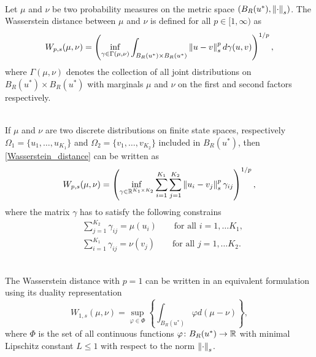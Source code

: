 \documentclass[10pt]{article}
\begin{document}
\begin{definition}
\label{Wasserstein_definition}
\leavevmode \\
Let $\mu$ and $\nu$ be two probability measures on the metric space $(B_R(u^*), \left\|\cdot\right\|_s)$. The Wasserstein distance between $\mu$ and $\nu$ is defined for all $p \in [1, \infty)$ as
\begin{equation}
\label{Wasserstein_distance}
W_{p,s}(\mu, \nu) = \left ( \inf_{\gamma \in \Gamma(\mu, \nu)} \int_{B_R(u^*) \times B_R(u^*)} \left\|u - v\right\|_s^p d \gamma(u,v) \right )^{1/p},
\end{equation}
where $\Gamma(\mu, \nu)$ denotes the collection of all joint distributions on $B_R(u^*) \times B_R(u^*)$ with marginals $\mu$ and $\nu$ on the first and second factors respectively.
\end{definition}

\begin{remark}
\leavevmode \\
If $\mu$ and $\nu$ are two discrete distributions on finite state spaces, respectively $\Omega_1 = \{ u_1, \dots, u_{K_1} \}$ and $\Omega_2 = \{ v_1, \dots, v_{K_2} \}$ included in $B_R(u^*)$, then \eqref{Wasserstein_distance} can be written as
\begin{equation}
\label{Wasserstein_distance_discrete}
W_{p,s}(\mu, \nu) = \left ( \inf_{\gamma \in \mathbb{R}^{K_1 \times K_2}} \sum_{i=1}^{K_1} \sum_{j=1}^{K_2} \left\|u_i - v_j\right\|_s^p \gamma_{ij} \right )^{1/p},
\end{equation}
where the matrix $\gamma$ has to satisfy the following constrains
\begin{align*}
& \sum_{j=1}^{K_2} \gamma_{ij} = \mu(u_i) \qquad \text{for all } i = 1, \dots K_1, \\
& \sum_{i=1}^{K_1} \gamma_{ij} = \nu(v_j) \qquad \text{for all } j = 1, \dots K_2.
\end{align*}
\end{remark}

\begin{remark}
\leavevmode \\
The Wasserstein distance with $p = 1$ can be written in an equivalent formulation using its duality representation
\begin{equation}
\label{Wasserstein_dual}
W_{1,s}(\mu, \nu) = \sup_{\varphi \in \Phi} \left \{ \int_{B_R(u^*)} \varphi d(\mu - \nu) \right \},
\end{equation}
where $\Phi$ is the set of all continuous functions $\varphi \colon B_R(u^*) \to \mathbb{R}$ with minimal Lipschitz constant $L \le 1$ with respect to the norm $\left\|\cdot\right\|_s$.
\end{remark}
\end{document}
